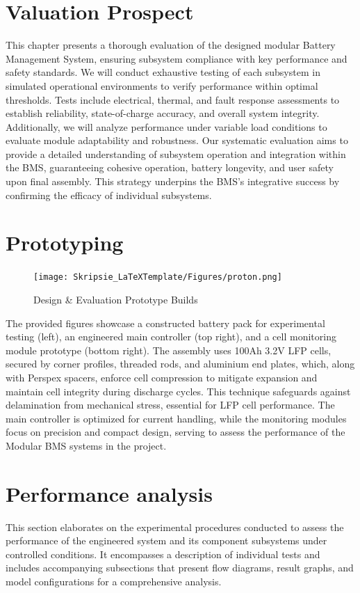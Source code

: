 \section{Valuation Prospect}\label{sec:prospect}
This chapter presents a thorough evaluation of the designed modular Battery Management System, ensuring subsystem compliance with key performance and safety standards. We will conduct exhaustive testing of each subsystem in simulated operational environments to verify performance within optimal thresholds. Tests include electrical, thermal, and fault response assessments to establish reliability, state-of-charge accuracy, and overall system integrity. Additionally, we will analyze performance under variable load conditions to evaluate module adaptability and robustness. Our systematic evaluation aims to provide a detailed understanding of subsystem operation and integration within the BMS, guaranteeing cohesive operation, battery longevity, and user safety upon final assembly. This strategy underpins the BMS's integrative success by confirming the efficacy of individual subsystems.\newpage
\section{Prototyping}\label{sec:theProto}
\begin{figure}[h!]
\centering
\texttt{[image: Skripsie\_LaTeXTemplate/Figures/proton.png]}
\caption{Design \& Evaluation Prototype Builds}
\label{fig:protonn}
\end{figure}

\noindent
The provided figures showcase a constructed battery pack for experimental testing (left), an engineered main controller (top right), and a cell monitoring module prototype (bottom right). The assembly uses 100Ah 3.2V LFP cells, secured by corner profiles, threaded rods, and aluminium end plates, which, along with Perspex spacers, enforce cell compression to mitigate expansion and maintain cell integrity during discharge cycles. This technique safeguards against delamination from mechanical stress, essential for LFP cell performance. The main controller is optimized for current handling, while the monitoring modules focus on precision and compact design, serving to assess the performance of the Modular BMS systems in the project.
\section{Performance analysis}\label{sec:systEVAL}
This section elaborates on the experimental procedures conducted to assess the performance of the engineered system and its component subsystems under controlled conditions. It encompasses a description of individual tests and includes accompanying subsections that present flow diagrams, result graphs, and model configurations for a comprehensive analysis.\newpage
